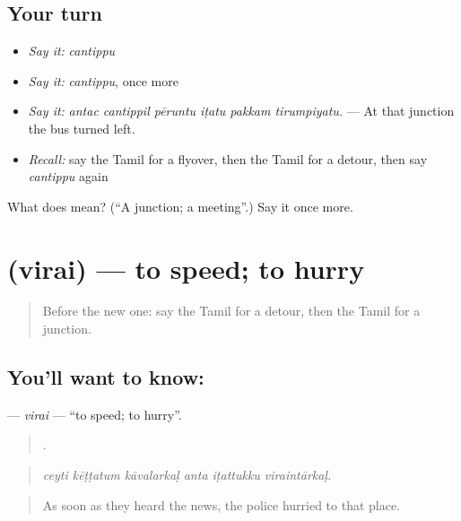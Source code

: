 \subsection*{Your turn}
\begin{itemize}
\raggedright
  \item \emph{Say it:} \emph{cantippu}
  \item \emph{Say it:} \emph{cantippu}, once more
  \item \emph{Say it:} \emph{antac cantippil pēruntu iṭatu pakkam tirumpiyatu.} — At that junction the bus turned left.
  \item \emph{Recall:} say the Tamil for a flyover, then the Tamil for a detour, then say \emph{cantippu} again
\end{itemize}

\begin{tcolorbox}[breakable,colback=teal!4,colframe=teal!35!black,title={Before you move on}]
What does  mean? (\textquotedblleft{}A junction; a meeting\textquotedblright{}.) Say it once more.
\end{tcolorbox}
\section[\texorpdfstring{\ta{விரை} (virai)}{விரை (virai)}]{ (virai) — to speed; to hurry}

\label{lesson:TA-C403-virai}



\begin{quote}
Before the new one: say the Tamil for a detour, then the Tamil for a junction.
\end{quote}

\subsection*{You'll want to know: }
\textbf{} — \emph{virai} — \textquotedblleft{}to speed; to hurry\textquotedblright{}.

\begin{quote}
     .
\end{quote}

\begin{quote}
\emph{ceyti kēṭṭatum kāvalarkaḷ anta iṭattukku viraintārkaḷ.}
\end{quote}

\begin{quote}
As soon as they heard the news, the police hurried to that place.
\end{quote}

